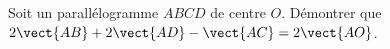 
\begin{exercice}\label{exosmath-0071}

    Soit un parallélogramme \( ABCD\) de centre \( O\). Démontrer que \( 2\vect{ AB }+2\vect{ AD }-\vect{ AC }=2\vect{ AO }\).

\end{exercice}
